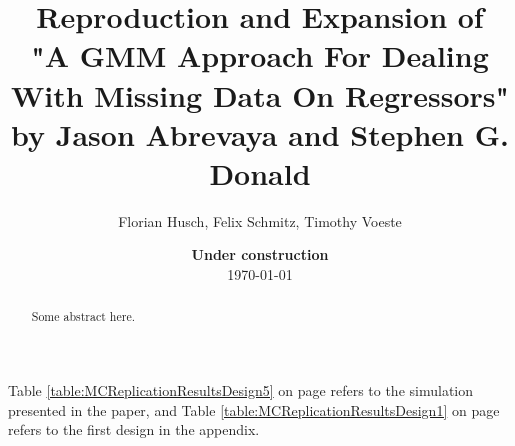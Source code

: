 \documentclass[11pt, a4paper, leqno]{article}
\begin{document}
\title{Reproduction and Expansion of \\"A GMM Approach For Dealing With Missing Data On Regressors" by Jason Abrevaya and Stephen G. Donald}

\author{Florian Husch, Felix Schmitz, Timothy Voeste}

\date{
    {\bf Under construction}
    \\[1ex]
    \today
}

\maketitle
{}

\begin{abstract}
    Some abstract here.
\end{abstract}

\clearpage



Table \ref{table:MCReplicationResultsDesign5} on page \pageref{table:MCReplicationResultsDesign5} refers
to the simulation presented in the paper, and Table \ref{table:MCReplicationResultsDesign1} on page \pageref{table:MCReplicationResultsDesign1}
refers to the first design in the appendix.


\end{document}
